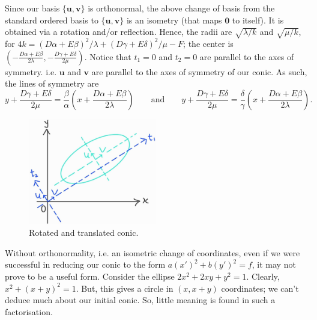 \documentclass[../Notes.tex]{subfiles}
\begin{document}
Since our basis \(\{\mathbf{u},\mathbf{v}\}\) is orthonormal, the above change of basis from the standard ordered basis to \(\{\mathbf{u},\mathbf{v}\}\) is an isometry (that maps \(\mathbf{0}\) to itself). It is obtained via a rotation and/or reflection. Hence, the radii are \(\sqrt{\lambda/k}\) and \(\sqrt{\mu/k}\), for \(4k=(D\alpha+E\beta)^2/\lambda+(D\gamma+E\delta)^2/\mu-F\); the center is \(\left(-\frac{D\alpha+E\beta}{2\lambda},-\frac{D\gamma+E\delta}{2\mu} \right)\). Notice that \(t_1=0\) and \(t_2=0\) are parallel to the axes of symmetry. i.e. \(\mathbf{u}\) and \(\mathbf{v}\) are parallel to the axes of symmetry of our conic. As such, the lines of symmetry are 
\[y+\frac{D\gamma+E\delta}{2\mu}=\frac{\beta}{\alpha}\left( x+\frac{D\alpha+E\beta}{2\lambda} \right) \qquad\text{and}\qquad y+\frac{D\gamma+E\delta}{2\mu}=\frac{\delta}{\gamma}\left( x+\frac{D\alpha+E\beta}{2\lambda} \right).\]
\begin{figure}[htbp]
    \centering
    \includegraphics[width=0.5\textwidth]{../Diagrams/rotated-conics.jpg}
    \caption{Rotated and translated conic.}
    \label{fig:rotated-conic}
\end{figure}
\begin{note}
    Without orthonormality, i.e. an isometric change of coordinates, even if we were successful in reducing our conic to the form \(a(x')^2+b(y')^2=f\), it may not prove to be a useful form. Consider the ellipse \(2x^2+2xy+y^2=1\). Clearly, \(x^2+(x+y)^2=1\). But, this gives a circle in \((x,x+y)\) coordinates; we can't deduce much about our initial conic. So, little meaning is found in such a factorisation. 
\end{note}
\end{document}

